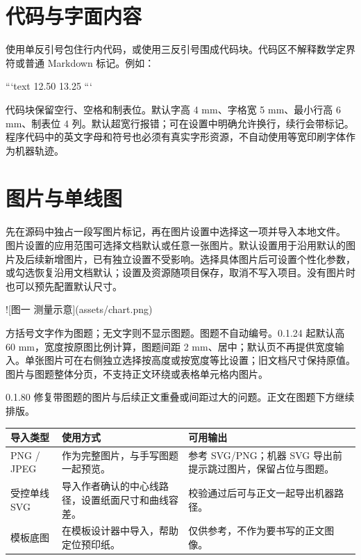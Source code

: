 \section{代码与字面内容}
使用单反引号包住行内代码，或使用三反引号围成代码块。代码区不解释数学定界符或普通 Markdown 标记。例如：
\par\noindent\begin{minipage}{\linewidth}
\begin{Source}
```text
12.50
  13.25
```
\end{Source}
\end{minipage}\par\medskip
代码块保留空行、空格和制表位。默认字高 4 mm、字格宽 5 mm、最小行高 6 mm、制表位 4 列。默认超宽行报错；可在设置中明确允许换行，续行会带标记。程序代码中的英文字母和符号也必须有真实字形资源，不自动使用等宽印刷字体作为机器轨迹。

\section{图片与单线图}
先在源码中独占一段写图片标记，再在图片设置中选择这一项并导入本地文件。
图片设置的应用范围可选择文档默认或任意一张图片。默认设置用于沿用默认的图片及后续新增图片，已有独立设置不受影响。选择具体图片后可设置个性化参数，或勾选恢复沿用文档默认；设置及资源随项目保存，取消不写入项目。没有图片时也可以预先配置默认尺寸。
\par\noindent\begin{minipage}{\linewidth}
\begin{Source}
![图一 测量示意](assets/chart.png)
\end{Source}
\end{minipage}\par\medskip
方括号文字作为图题；无文字则不显示图题。图题不自动编号。0.1.24 起默认高 60 mm，宽度按原图比例计算，图题间距 2 mm、居中；默认页不再提供宽度输入。单张图片可在右侧独立选择按高度或按宽度等比设置；旧文档尺寸保持原值。图片与图题整体分页，不支持正文环绕或表格单元格内图片。

0.1.80 修复带图题的图片与后续正文重叠或间距过大的问题。正文在图题下方继续排版。

\par\noindent\begin{tabularx}{\linewidth}{@{}P{31mm}Y Y@{}}
\toprule
导入类型 & 使用方式 & 可用输出\\\midrule
PNG / JPEG & 作为完整图片，与手写图题一起预览。 & 参考 SVG/PNG；机器 SVG 导出前提示跳过图片，保留占位与图题。\\
受控单线 SVG & 导入作者确认的中心线路径，设置纸面尺寸和曲线容差。 & 校验通过后可与正文一起导出机器路径。\\
模板底图 & 在模板设计器中导入，帮助定位预印纸。 & 仅供参考，不作为要书写的正文图像。\\
\bottomrule
\end{tabularx}

